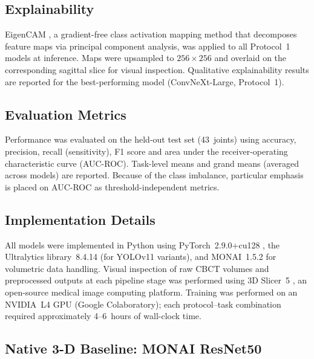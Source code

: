 \documentclass[review,12pt]{elsarticle}
\begin{document}
\subsection{Explainability}
\label{sec:xai}

EigenCAM \cite{muhammad2020eigen}, a gradient-free class activation mapping
method that decomposes feature maps via principal component analysis,
was applied to all Protocol~1 models at inference. Maps were upsampled
to $256 \times 256$ and overlaid on the corresponding sagittal slice
for visual inspection. Qualitative explainability results are reported
for the best-performing model (ConvNeXt-Large, Protocol~1).

\subsection{Evaluation Metrics}
\label{sec:metrics}

Performance was evaluated on the held-out test set (43~joints) using
accuracy, precision, recall (sensitivity), F1 score and area under the
receiver-operating characteristic curve (AUC-ROC). Task-level means and grand means
(averaged across models) are reported. Because of the class imbalance,
particular emphasis is placed on AUC-ROC as
threshold-independent metrics.

\subsection{Implementation Details}
\label{sec:impl}

All models were implemented in Python using PyTorch~2.9.0+cu128 \cite{paszke2019pytorch}, the Ultralytics library~8.4.14 \cite{yolo11_ultralytics} (for YOLOv11 variants), and MONAI~1.5.2 \cite{monai2026} for volumetric data handling. Visual inspection of raw CBCT volumes and preprocessed outputs at each pipeline stage was performed using 3D Slicer~5 \cite{Slicer2021}, an open-source medical image computing platform. Training was performed on an NVIDIA~L4 GPU (Google Colaboratory); each protocol--task combination required approximately 4--6~hours of wall-clock time.

\subsection{Native 3-D Baseline: MONAI ResNet50}
\label{sec:monai3d}
\end{document}

